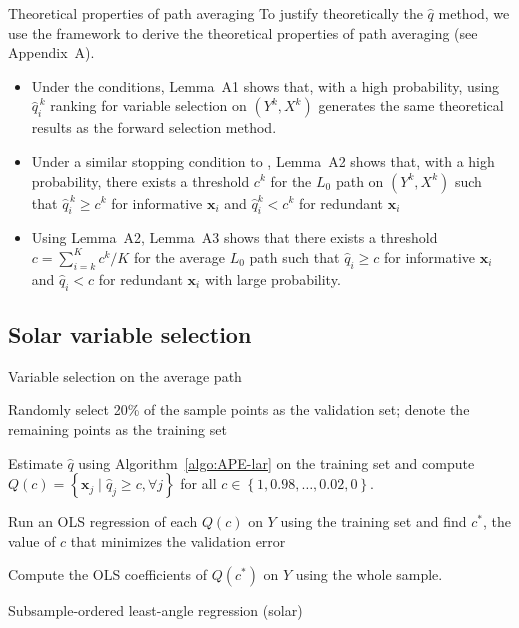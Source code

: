 \documentclass{beamer}
\begin{document}
\begin{frame}{Theoretical properties of path averaging}
  To justify theoretically the $\widehat{q}$ method, we use the \citet{zhang09} framework to derive the theoretical properties of path averaging (see Appendix~A).

  \begin{itemize}
    \item Under the \citet{zhang09} conditions, Lemma~A1 shows that, with a high probability, using $\widehat{q}^{\,k}_i$ ranking for variable selection on $\left( Y^k, X^k \right)$ generates the same theoretical results as the \citet{zhang09} forward selection method.
    \item Under a similar stopping condition to \citet{zhang09}, Lemma~A2 shows that, with a high probability, there exists a threshold $c^k$ for the $L_0$ path on $\left( Y^k, X^k \right)$ such that $\widehat{q}^{\,k}_i \geqslant c^k$ for informative $\mathbf{x}_i$ and $\widehat{q}^k_i < c^k$ for redundant $\mathbf{x}_i$
    \item Using Lemma~A2, Lemma~A3 shows that there exists a threshold $c = \sum_{i=k}^{K} c^k/K$ for the average $L_0$ path such that $\widehat{q}_i \geqslant c$ for informative $\mathbf{x}_i$ and $\widehat{q}_i < c$ for redundant $\mathbf{x}_i$ with large probability.
  \end{itemize}
\end{frame}

\subsection{Solar variable selection}

\begin{frame}{Variable selection on the average path}
  \begin{algorithm}[H]

  
    \smallskip
    Randomly select 20\% of the sample points as the validation set; denote the remaining points as the training set\;
  
    Estimate $\widehat{q}$ using Algorithm~\ref{algo:APE-lar} on the training set and compute $Q(c) = \left\{ \mathbf{x}_j \; \vert \; \widehat{q}_j \geqslant c, \forall j\right\}$ for all $c \in \left\{ 1, 0.98, \ldots, 0.02, 0 \right\}.$
  
    Run an OLS regression of each $Q(c)$ on $Y$ using the training set and find $c^*$, the value of $c$ that minimizes the validation error\;
  
    Compute the OLS coefficients of $Q(c^*)$ on $Y$ using the whole sample.
  
    \caption{Subsample-ordered least-angle regression (solar)}
  \end{algorithm}
\end{frame}
\end{document}
